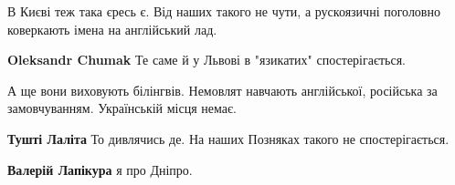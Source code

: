 \begin{itemize}
 

В Києві теж така єресь є. Від наших такого не чути, а рускоязичні поголовно
коверкають імена на англійський лад.

\begin{itemize}
 
\textbf{Oleksandr Chumak} Те саме й у Львові в "язикатих" спостерігається.
\end{itemize}

 
А ще вони виховують білінгвів. Немовлят навчають англійської, російська за
замовчуванням. Українській місця немає.

\begin{itemize}
 
\textbf{Тушті Лаліта} То дивлячись де. На наших Позняках такого не спостерігається.

 
\textbf{Валерій Лапікура} я про Дніпро.

 

\end{itemize}
\end{itemize}
